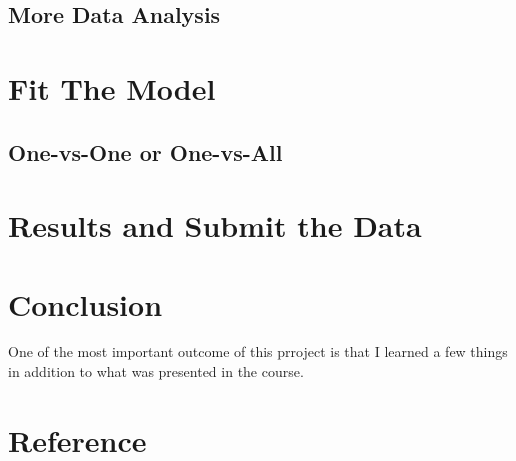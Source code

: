 \documentclass[]{article}
\begin{document}
\hypertarget{more-data-analysis}{%
\subsection{More Data Analysis}\label{more-data-analysis}}

\hypertarget{fit-the-model}{%
\section{Fit The Model}\label{fit-the-model}}

\hypertarget{one-vs-one-or-one-vs-all}{%
\subsection{One-vs-One or One-vs-All}\label{one-vs-one-or-one-vs-all}}

\hypertarget{results-and-submit-the-data}{%
\section{Results and Submit the
Data}\label{results-and-submit-the-data}}

\hypertarget{conclusion}{%
\section{Conclusion}\label{conclusion}}

One of the most important outcome of this prroject is that I learned a
few things in addition to what was presented in the course.

\hypertarget{reference}{%
\section{Reference}\label{reference}}
\end{document}
